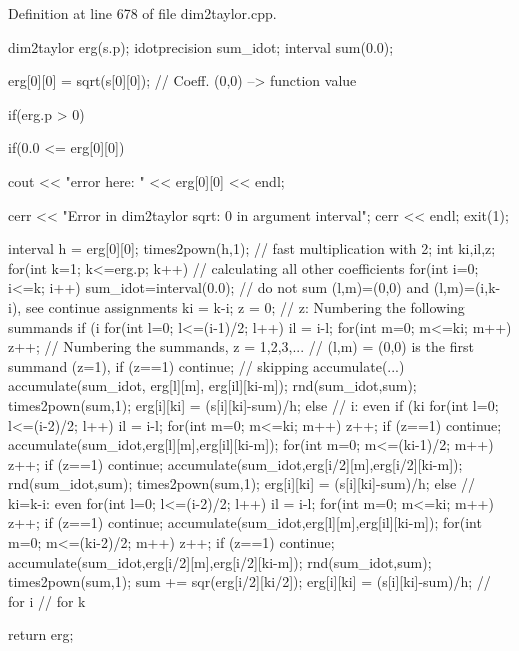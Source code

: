 \-Definition at line 678 of file dim2taylor.\-cpp.


\begin{DoxyCode}
{ 
 dim2taylor erg(s.p);
 idotprecision sum_idot;
 interval sum(0.0);

 erg[0][0] = sqrt(s[0][0]);  // Coeff. (0,0) --> function value
  
  if(erg.p > 0)
  { 
   if(0.0 <= erg[0][0])
      {
  cout << "error here: " << erg[0][0] << endl;
   
  cerr << "Error in dim2taylor sqrt: 0 in argument interval";
  cerr << endl;
  exit(1);
      }
      
    
    interval h = erg[0][0]; 
    times2pown(h,1); // fast multiplication with 2;
    int ki,il,z;
    for(int k=1; k<=erg.p; k++) // calculating all other coefficients
    {   
  for(int i=0; i<=k; i++)
  {   
      sum_idot=interval(0.0);
    // do not sum (l,m)=(0,0) and (l,m)=(i,k-i), see continue assignments
      ki = k-i;   z = 0; // z: Numbering the following summands 
      if (i%
      { 
    for(int l=0; l<=(i-1)/2; l++) 
    {
        il = i-l;   
        for(int m=0; m<=ki; m++)
        {
      z++; // Numbering the summands, z = 1,2,3,...
      // (l,m) = (0,0) is the first summand (z=1),
      if (z==1) continue; // skipping accumulate(...)
      accumulate(sum_idot, erg[l][m], erg[il][ki-m]);
        }
    }
    rnd(sum_idot,sum);
    times2pown(sum,1);
    erg[i][ki] = (s[i][ki]-sum)/h;
      }
      else // i: even
      {
    if (ki%
    {
        for(int l=0; l<=(i-2)/2; l++) 
        {
      il = i-l;
      for(int m=0; m<=ki; m++)
      {
          z++;
          if (z==1) continue;
          accumulate(sum_idot,erg[l][m],erg[il][ki-m]);
      }
        }
        for(int m=0; m<=(ki-1)/2; m++)
        {
      z++;
      if (z==1) continue;
      accumulate(sum_idot,erg[i/2][m],erg[i/2][ki-m]);
        }
        rnd(sum_idot,sum);
        times2pown(sum,1);
        erg[i][ki] = (s[i][ki]-sum)/h;
    }
    else // ki=k-i: even
    {
        for(int l=0; l<=(i-2)/2; l++)
        {
      il = i-l;
      for(int m=0; m<=ki; m++)
      {
          z++;
          if (z==1) continue;
          accumulate(sum_idot,erg[l][m],erg[il][ki-m]);
      }
        }
        for(int m=0; m<=(ki-2)/2; m++)
        {
      z++;
      if (z==1) continue;
      accumulate(sum_idot,erg[i/2][m],erg[i/2][ki-m]);
        }
        rnd(sum_idot,sum);
        times2pown(sum,1);
        sum += sqr(erg[i/2][ki/2]);
        erg[i][ki] = (s[i][ki]-sum)/h;
    }
      }
  } // for i
      }   // for k
  }

 return erg;
 }
\end{DoxyCode}
